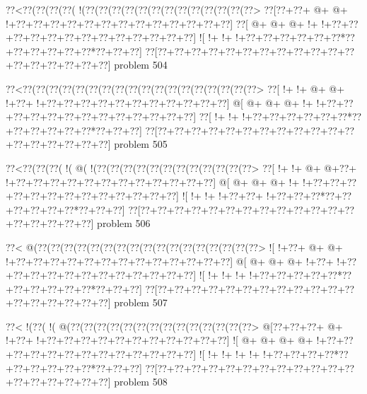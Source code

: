 \vbox{\vbox{\goo
\0??<\0??(\0??(\0??(\0??(\- !(\0??(\0??(\0??(\0??(\0??(\0??(\0??(\0??(\0??(\0??(\0??(\0??(\0??>
\0??[\0??+\0??+\- @+\- @+\- !+\0??+\0??+\0??+\0??+\0??+\0??+\0??+\0??+\0??+\0??+\0??+\0??+\0??]
\0??[\- @+\- @+\- @+\- !+\- !+\0??+\0??+\0??+\0??+\0??+\0??+\0??+\0??+\0??+\0??+\0??+\0??+\0??]
\- ![\- !+\- !+\- !+\0??+\0??+\0??+\0??+\0??+\0??*\0??+\0??+\0??+\0??+\0??+\0??*\0??+\0??+\0??]
\0??[\0??+\0??+\0??+\0??+\0??+\0??+\0??+\0??+\0??+\0??+\0??+\0??+\0??+\0??+\0??+\0??+\0??+\0??]
}
\hfil problem 504\hfil\break
}



\vbox{\vbox{\goo
\0??<\0??(\0??(\0??(\0??(\0??(\0??(\0??(\0??(\0??(\0??(\0??(\0??(\0??(\0??(\0??(\0??(\0??(\0??>
\0??[\- !+\- !+\- @+\- @+\- !+\0??+\- !+\0??+\0??+\0??+\0??+\0??+\0??+\0??+\0??+\0??+\0??+\0??]
\- @[\- @+\- @+\- @+\- !+\- !+\0??+\0??+\0??+\0??+\0??+\0??+\0??+\0??+\0??+\0??+\0??+\0??+\0??]
\0??[\- !+\- !+\- !+\0??+\0??+\0??+\0??+\0??+\0??*\0??+\0??+\0??+\0??+\0??+\0??*\0??+\0??+\0??]
\0??[\0??+\0??+\0??+\0??+\0??+\0??+\0??+\0??+\0??+\0??+\0??+\0??+\0??+\0??+\0??+\0??+\0??+\0??]
}
\hfil problem 505\hfil\break
}



\vbox{\vbox{\goo
\0??<\0??(\0??(\0??(\- !(\- @(\- !(\0??(\0??(\0??(\0??(\0??(\0??(\0??(\0??(\0??(\0??(\0??(\0??>
\0??[\- !+\- !+\- @+\- @+\0??+\- !+\0??+\0??+\0??+\0??+\0??+\0??+\0??+\0??+\0??+\0??+\0??+\0??]
\- @[\- @+\- @+\- @+\- !+\- !+\0??+\0??+\0??+\0??+\0??+\0??+\0??+\0??+\0??+\0??+\0??+\0??+\0??]
\- ![\- !+\- !+\- !+\0??+\0??+\- !+\0??+\0??+\0??*\0??+\0??+\0??+\0??+\0??+\0??*\0??+\0??+\0??]
\0??[\0??+\0??+\0??+\0??+\0??+\0??+\0??+\0??+\0??+\0??+\0??+\0??+\0??+\0??+\0??+\0??+\0??+\0??]
}
\hfil problem 506\hfil\break
}



\vbox{\vbox{\goo
\0??<\- @(\0??(\0??(\0??(\0??(\0??(\0??(\0??(\0??(\0??(\0??(\0??(\0??(\0??(\0??(\0??(\0??(\0??>
\- ![\- !+\0??+\- @+\- @+\- !+\0??+\0??+\0??+\0??+\0??+\0??+\0??+\0??+\0??+\0??+\0??+\0??+\0??]
\- @[\- @+\- @+\- @+\- !+\0??+\- !+\0??+\0??+\0??+\0??+\0??+\0??+\0??+\0??+\0??+\0??+\0??+\0??]
\- ![\- !+\- !+\- !+\- !+\0??+\0??+\0??+\0??+\0??*\0??+\0??+\0??+\0??+\0??+\0??*\0??+\0??+\0??]
\0??[\0??+\0??+\0??+\0??+\0??+\0??+\0??+\0??+\0??+\0??+\0??+\0??+\0??+\0??+\0??+\0??+\0??+\0??]
}
\hfil problem 507\hfil\break
}



\vbox{\vbox{\goo
\0??<\- !(\0??(\- !(\- @(\0??(\0??(\0??(\0??(\0??(\0??(\0??(\0??(\0??(\0??(\0??(\0??(\0??(\0??>
\- @[\0??+\0??+\0??+\- @+\- !+\0??+\- !+\0??+\0??+\0??+\0??+\0??+\0??+\0??+\0??+\0??+\0??+\0??]
\- ![\- @+\- @+\- @+\- @+\- !+\0??+\0??+\0??+\0??+\0??+\0??+\0??+\0??+\0??+\0??+\0??+\0??+\0??]
\- ![\- !+\- !+\- !+\- !+\- !+\0??+\0??+\0??+\0??*\0??+\0??+\0??+\0??+\0??+\0??*\0??+\0??+\0??]
\0??[\0??+\0??+\0??+\0??+\0??+\0??+\0??+\0??+\0??+\0??+\0??+\0??+\0??+\0??+\0??+\0??+\0??+\0??]
}
\hfil problem 508\hfil\break
}



